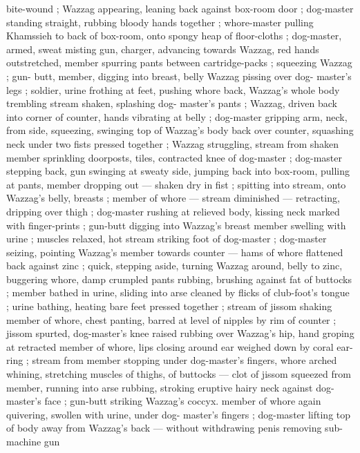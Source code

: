 bite-wound ; Wazzag appearing, leaning back against box-room door ; 
dog-master standing straight, rubbing bloody hands together ; 
whore-master pulling Khamssieh to back of box-room, onto spongy 
heap of floor-cloths ; dog-master, armed, sweat misting gun, charger, 
advancing towards Wazzag, red hands outstretched, member 
spurring pants between cartridge-packs ; squeezing Wazzag ; gun- 
butt, member, digging into breast, belly {\col} Wazzag pissing over dog- 
master's legs ; soldier, urine frothing at feet, pushing whore back, 
Wazzag's whole body trembling {\col} stream shaken, splashing dog- 
master's pants ; Wazzag, driven back into corner of counter, hands 
vibrating at belly ; dog-master gripping arm, neck, from side, 
squeezing, swinging top of Wazzag's body back over counter, 
squashing neck under two fists pressed together ; Wazzag 
struggling, stream from shaken member sprinkling doorposts, tiles, 
contracted knee of dog-master ; dog-master stepping back, gun 
swinging at sweaty side, jumping back into box-room, pulling at 
pants, member dropping out --- shaken dry in fist ; spitting into 
stream, onto Wazzag's belly, breasts ; member of whore --- stream 
diminished --- retracting, dripping over thigh ; dog-master rushing at 
relieved body, kissing neck marked with finger-prints ; gun-butt 
digging into Wazzag's breast {\col} member swelling with urine ; muscles 
relaxed, hot stream striking foot of dog-master ; dog-master seizing, 
pointing Wazzag's member towards counter --- hams of whore 
flattened back against zinc ; quick, stepping aside, turning Wazzag 
around, belly to zinc, buggering whore, damp crumpled pants 
rubbing, brushing against fat of buttocks ; member bathed in urine, 
sliding into arse cleaned by flicks of club-foot's tongue ; urine 
bathing, heating bare feet pressed together ; stream of jissom 
shaking member of whore, chest panting, barred at level of nipples 
by rim of counter ; jissom spurted, dog-master's knee raised rubbing 
over Wazzag's hip, hand groping at retracted member of whore, lips 
closing around ear weighed down by coral ear-ring ; stream from 
member stopping under dog-master's fingers, whore arched whining, 
stretching muscles of thighs, of buttocks --- clot of jissom squeezed 
from member, running into arse {\dashcom} rubbing, stroking eruptive hairy 
neck against dog-master's face ; gun-butt striking Wazzag's coccyx. 
member of whore again quivering, swollen with urine, under dog- 
master's fingers ; dog-master lifting top of body away from Wazzag's 
back --- without withdrawing penis {\dashcom} removing sub-machine gun 
